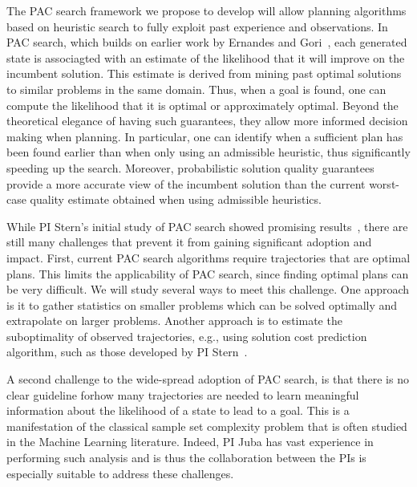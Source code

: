 \documentclass[12pt]{article}
\begin{document}
The PAC search framework we propose to develop will allow planning algorithms based on heuristic search to fully exploit past experience and observations. In PAC search, which builds on earlier work by Ernandes and Gori~\cite{ernandes2004likely}, each generated state is associagted with an estimate of the likelihood that it will improve on the incumbent solution. This estimate is derived from mining past optimal solutions to similar problems in the same domain. Thus, when a goal is found, one can compute the likelihood that it is optimal or approximately optimal. Beyond the theoretical elegance of having such guarantees, they allow more informed decision making when planning. In particular, one can identify when a sufficient plan has been found earlier than when only using an admissible heuristic, thus significantly speeding up the search. Moreover, probabilistic solution quality guarantees 
provide a more accurate view of the incumbent solution than the current worst-case quality estimate obtained when using admissible heuristics.  



While PI Stern's initial study of PAC search showed promising results~\cite{stern2011probably,stern2012search}, there are still many challenges that prevent it from gaining significant adoption and impact. First, current PAC search algorithms require trajectories that are optimal plans. This limits the applicability of PAC search, since finding optimal plans can be very difficult. We will study several ways to meet this challenge. One approach is it to gather statistics on smaller problems which can be solved optimally and extrapolate on larger problems. Another approach is to estimate the suboptimality of observed trajectories, e.g., using solution cost prediction algorithm, such as those developed by PI Stern~\cite{}. 



A second challenge to the wide-spread adoption of PAC search, is that there is no clear guideline forhow many trajectories are needed to learn meaningful information about the likelihood of a state to lead to a goal. This is a manifestation of the classical sample set complexity problem that is often studied in the Machine Learning literature. Indeed, PI Juba has vast experience in performing such analysis and is thus the collaboration between the PIs is especially suitable to address these challenges. 
\end{document}
